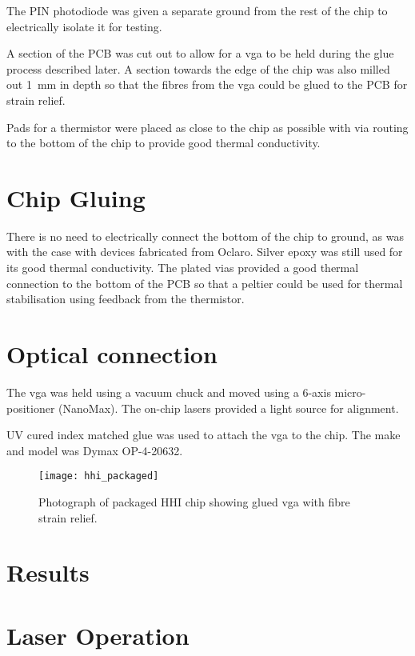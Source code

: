 The PIN photodiode was given a separate ground from the rest of the chip to electrically isolate it for testing.

A section of the PCB was cut out to allow for a \ac{vga} to be held during the glue process described later. A section towards the edge of the chip was also milled out \SI{1}{mm} in depth so that the fibres from the \ac{vga} could be glued to the PCB for strain relief.

Pads for a thermistor were placed as close to the chip as possible with via routing to the bottom of the chip to provide good thermal conductivity.

\section{Chip Gluing}

There is no need to electrically connect the bottom of the chip to ground, as was with the case with devices fabricated from Oclaro. Silver epoxy was still used for its good thermal conductivity. The plated vias provided a good thermal connection to the bottom of the PCB so that a peltier could be used for thermal stabilisation using feedback from the thermistor.

\section{Optical connection}

The \ac{vga} was held using a vacuum chuck and moved using a 6-axis micro-positioner (NanoMax). The on-chip lasers provided a light source for alignment. 

UV cured index matched glue was used to attach the \ac{vga} to the chip. The make and model was Dymax OP-4-20632.

\begin{figure}
	\centering
	\texttt{[image: hhi\_packaged]}
	\caption[Photo of packaged HHI chip]{Photograph of packaged HHI chip showing glued \ac{vga} with fibre strain relief.}
	\label{fig:hhi_photo}
\end{figure}

\section{Results}

\section{Laser Operation}

